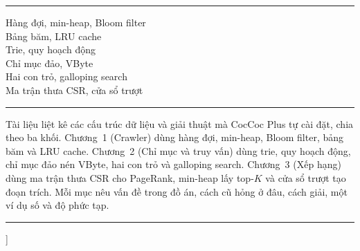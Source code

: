 \documentclass[9pt,twocolumn,a4paper]{extarticle}
\newcommand{\spaced}[1]{\textls[160]{#1}}
\begin{document}
{\begin{@twocolumnfalse}
\noindent\begin{minipage}[t]{0.255\textwidth}
{\footnotesize\spaced{T Ừ \ \ K H Ó A}\par}
\vspace{2pt}\noindent\rule{\linewidth}{0.4pt}\par\vspace{3pt}
{\scriptsize
Hàng đợi, min-heap, Bloom filter\\
Bảng băm, LRU cache\\
Trie, quy hoạch động\\
Chỉ mục đảo, VByte\\
Hai con trỏ, galloping search\\
Ma trận thưa CSR, cửa sổ trượt\par}
\end{minipage}\hfill
\begin{minipage}[t]{0.715\textwidth}
{\footnotesize\spaced{T Ó M \ \ T Ắ T}\par}
\vspace{2pt}\noindent\rule{\linewidth}{0.4pt}\par\vspace{3pt}
{\scriptsize\setlength{\parindent}{0pt}\linespread{1.08}\selectfont
Tài liệu liệt kê các cấu trúc dữ liệu và giải thuật mà CocCoc Plus tự cài đặt, chia theo ba khối. Chương~1 (Crawler) dùng hàng đợi, min-heap, Bloom filter, bảng băm và LRU cache. Chương~2 (Chỉ mục và truy vấn) dùng trie, quy hoạch động, chỉ mục đảo nén VByte, hai con trỏ và galloping search. Chương~3 (Xếp hạng) dùng ma trận thưa CSR cho PageRank, min-heap lấy top-$K$ và cửa sổ trượt tạo đoạn trích. Mỗi mục nêu vấn đề trong đồ án, cách cũ hỏng ở đâu, cách giải, một ví dụ số và độ phức tạp.\par}
\end{minipage}

\vspace{0.25cm}
\noindent\rule{\textwidth}{0.4pt}
\vspace{0.35cm}
\end{@twocolumnfalse}
}]
\end{document}
